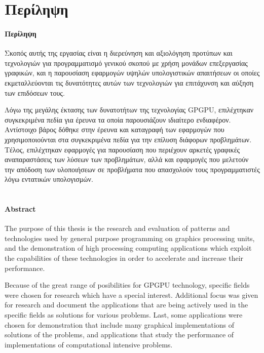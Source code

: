 \chapter{Περίληψη}
\subsubsection{Περίληψη}
Σκοπός αυτής της εργασίας είναι η διερεύνηση και αξιολόγηση προτύπων και τεχνολογιών για προγραμματισμό γενικού σκοπού με χρήση μονάδων επεξεργασίας γραφικών, και η παρουσίαση εφαρμογών υψηλών υπολογιστικών απαιτήσεων οι οποίες εκμεταλλεύονται τις δυνατότητες αυτών των τεχνολογιών για επιτάχυνση και αύξηση των επιδόσεων τους. 

Λόγω της μεγάλης έκτασης των δυνατοτήτων της τεχνολογίας GPGPU, επιλέχτηκαν συγκεκριμένα πεδία για έρευνα τα οποία παρουσιάζουν ιδιαίτερο ενδιαφέρον. Αντίστοιχο βάρος δόθηκε στην έρευνα και καταγραφή των εφαρμογών που χρησιμοποιούνται στα συγκεκριμένα πεδία για την επίλυση διάφορων προβλημάτων. Τέλος, επιλέχτηκαν εφαρμογές για παρουσίαση που περιέχουν αρκετές γραφικές αναπαραστάσεις των λύσεων των προβλημάτων, αλλά και εφαρμογές που μελετούν την απόδοση των υλοποιήσεων σε προβλήματα που απασχολούν τους προγραμματιστές λόγω εντατικών υπολογισμών.
\\
\\
\subsubsection{Abstract}
The purpose of this thesis is the research and evaluation of patterns and technologies used by general purpose programming on graphics processing units, and the demonstration of high processing computing applications which exploit the capabilities of these technologies in order to accelerate and increase their performance.

Because of the great range of posibilities for GPGPU technology, specific fields were chosen for research which have a special interest. Additional focus was given for research and document the applications that are being actively used in the specific fields as solutions for various problems. Last, some applications were chosen for demonstration that include many graphical implementations of solutions of the problems, and applications that study the performance of implementations of computational intensive problems.

\newpage